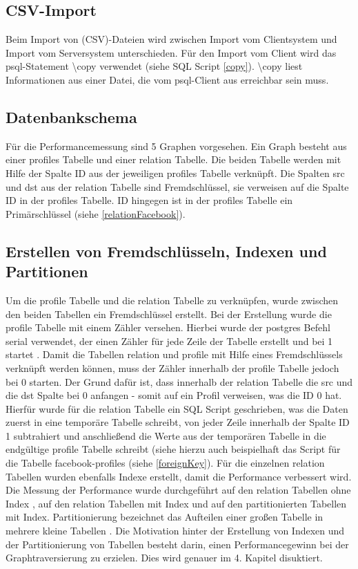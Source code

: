 \subsection{CSV-Import}
Beim Import von (CSV)-Dateien wird zwischen Import vom Clientsystem und  Import vom Serversystem unterschieden.
Für den Import vom Client wird das psql-Statement \textbackslash copy verwendet (siehe SQL Script \ref{copy}). \textbackslash copy liest Informationen aus einer Datei,
die vom psql-Client aus erreichbar sein muss. \cite{postgres2018}

\subsection{Datenbankschema}
Für die Performancemessung sind 5 Graphen vorgesehen. Ein Graph besteht aus einer profiles Tabelle und einer relation Tabelle. Die beiden Tabelle werden mit Hilfe der
Spalte ID aus der jeweiligen profiles Tabelle verknüpft. Die Spalten src und dst aus der relation Tabelle sind Fremdschlüssel, sie verweisen auf die Spalte ID in der
profiles Tabelle. ID hingegen ist in der profiles Tabelle ein Primärschlüssel (siehe \ref{relationFacebook}).

\subsection{Erstellen von Fremdschlüsseln, Indexen und Partitionen}
Um die profile Tabelle und die relation Tabelle zu verknüpfen, wurde zwischen den beiden Tabellen ein Fremdschlüssel erstellt. Bei der Erstellung wurde die profile Tabelle
mit einem Zähler versehen. Hierbei wurde der postgres Befehl serial verwendet, der einen Zähler für jede Zeile der Tabelle erstellt und bei 1 startet . Damit die Tabellen
relation und profile mit Hilfe eines Fremdschlüssels verknüpft werden können, muss der Zähler innerhalb der profile Tabelle jedoch bei 0 starten. Der Grund dafür ist, dass
innerhalb der relation Tabelle die src und die dst Spalte bei 0 anfangen - somit auf ein Profil verweisen, was die ID 0 hat. Hierfür wurde für die relation Tabelle ein
SQL Script geschrieben, was die Daten zuerst in eine temporäre Tabelle schreibt, von jeder Zeile innerhalb der Spalte ID 1 subtrahiert und anschließend die Werte aus
der temporären Tabelle in die endgültige profile Tabelle schreibt (siehe hierzu auch beispielhaft das Script für die Tabelle facebook-profiles (siehe \ref{foreignKey}).
Für die einzelnen relation Tabellen wurden ebenfalls Indexe erstellt, damit die Performance verbessert wird. Die Messung der Performance wurde durchgeführt auf
den relation Tabellen ohne Index , auf den relation Tabellen mit Index und auf den partitionierten Tabellen mit Index. Partitionierung bezeichnet das Aufteilen einer
großen Tabelle in mehrere kleine Tabellen \cite{postgrespartitioning} . Die Motivation hinter der Erstellung von Indexen und der Partitionierung von Tabellen besteht darin,
einen Performancegewinn bei der Graphtraversierung zu erzielen. Dies wird genauer im 4. Kapitel disuktiert.

